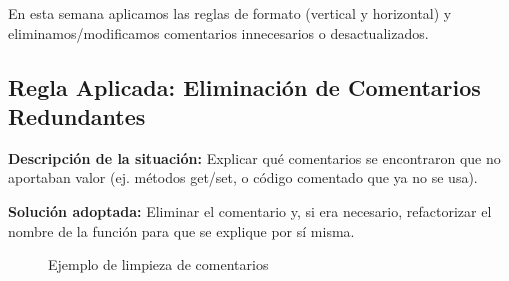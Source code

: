 En esta semana aplicamos las reglas de formato (vertical y horizontal) y eliminamos/modificamos comentarios innecesarios o desactualizados.

\subsection{Regla Aplicada: Eliminación de Comentarios Redundantes}
\textbf{Descripción de la situación:}
Explicar qué comentarios se encontraron que no aportaban valor (ej. métodos get/set, o código comentado que ya no se usa).

\textbf{Solución adoptada:}
Eliminar el comentario y, si era necesario, refactorizar el nombre de la función para que se explique por sí misma.

\begin{figure}[h]
    \centering
    \caption{Ejemplo de limpieza de comentarios}
    \label{fig:semana2_ejemplo1}
\end{figure}
